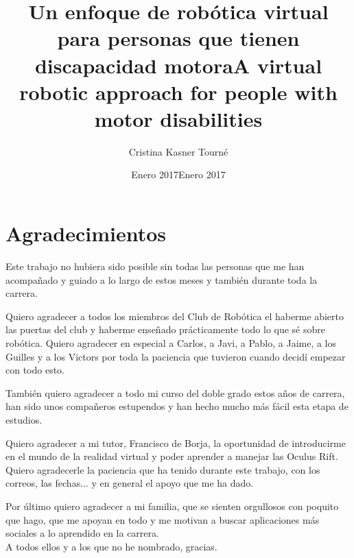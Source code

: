 \documentclass[twoside, 11pt]{epstfg}
\title[spa]{Un enfoque de robótica virtual para personas que tienen discapacidad motora}
\title[eng]{A virtual robotic approach for people with motor disabilities}
\author{Cristina Kasner Tourné}
\date[spa]{Enero 2017}
\date[eng]{Enero 2017}
\begin{document}

\frontmatter

\maketitle[spa]

\makeinnertitle[spa]

\makeabstract[spa]
\makeabstract[eng]





\chapter*{Agradecimientos}

Este trabajo no hubiera sido posible sin todas las personas que me han acompañado y guiado a lo largo de estos meses y también durante toda la carrera.

Quiero agradecer a todos los miembros del Club de Robótica el haberme abierto las puertas del club y haberme enseñado prácticamente todo lo que sé sobre robótica. Quiero agradecer en especial a Carlos, a Javi, a Pablo, a Jaime, a los Guilles y a los Victors por toda la paciencia que tuvieron cuando decidí empezar con todo esto.

También quiero agradecer a todo mi curso del doble grado estos años de carrera, han sido unos compañeros estupendos y han hecho mucho más fácil esta etapa de estudios.

Quiero agradecer a mi tutor, Francisco de Borja, la oportunidad de introducirme en el mundo de la realidad virtual y poder aprender a manejar las Oculus Rift. Quiero agradecerle la paciencia que ha tenido durante este trabajo, con los correos, las fechas... y en general el apoyo que me ha dado.

Por último quiero agradecer a mi familia, que se sienten orgullosos con poquito que hago, que me apoyan en todo y me motivan a buscar aplicaciones más sociales a lo aprendido en la carrera.\\A todos ellos y a los que no he nombrado, gracias.
\newpage



\tableofcontents
\clearpage
\listoftables
\clearpage
\listoffigures
\cleardoublepage
\end{document}
